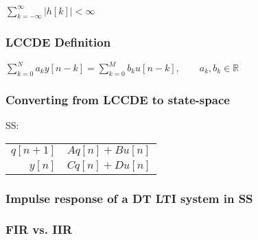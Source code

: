 \documentclass[7pt,a4paper]{scrartcl}
\begin{document}
\begin{multicols*}{4}
$\sum\limits_{k=-\infty}^\infty |h[k]|<\infty$

\subsubsection*{LCCDE Definition}

$\sum\limits_{k=0}^Na_ky[n-k]=\sum\limits_{k=0}^Mb_ku[n-k],\qquad a_k,b_k\in\mathbb{R}$


\subsubsection*{Converting from LCCDE to state-space}

SS: \begin{tabular}{r@{=}l}$q[n+1]$&$Aq[n]+Bu[n]$\\$y[n]$&$Cq[n]+Du[n]$\end{tabular}


\subsubsection*{Impulse response of a DT LTI system in SS}


\subsubsection*{FIR vs. IIR}


\end{multicols*}
\end{document}
